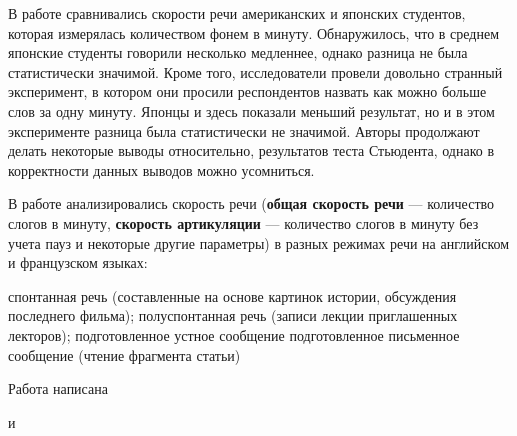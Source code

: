\par В работе \citep{osser64}  сравнивались скорости речи американских и японских студентов, которая измерялась количеством фонем в минуту. Обнаружилось, что в среднем японские студенты говорили несколько медленнее, однако разница не была статистически значимой. Кроме того, исследователи провели довольно странный эксперимент, в котором они просили респондентов назвать как можно больше слов за одну минуту. Японцы и здесь показали меньший результат, но и в этом эксперименте разница была статистически не значимой. Авторы продолжают делать некоторые выводы относительно, результатов теста Стьюдента, однако в корректности данных выводов можно усомниться.
\par В работе \citep{barik77} анализировались скорость речи (\textbf{общая скорость речи} --- количество слогов в минуту, \textbf{скорость артикуляции} --- количество слогов в минуту без учета пауз и некоторые другие параметры) в разных режимах речи на английском и французском языках:
\begin{itemize}
\mytem спонтанная речь (составленные на основе картинок истории, обсуждения последнего фильма);
\mytem полуспонтанная речь (записи лекции приглашенных лекторов);
\mytem подготовленное устное сообщение 
\mytem подготовленное письменное сообщение (чтение фрагмента статьи)
\end{itemize}

\par \citep{vaane82}
\par \citep{brown85}
\par \citep{tauroza90}
\par \citep{uhmann92}
\par \citep{zellner94}
\par \citep{arnfield95}
\par Работа \citep{roach98} написана 
\par \citep{dellwo03}
\par \citep{pellegrino04} и \citep{pellegrino11}
\par \citep{hilton11}
\par \citep{pellegrino11}
\par \citep{stepanova11}
\par \citep{kendall13}
\par \citep{bosker15}
\par \citep{bosker16}
